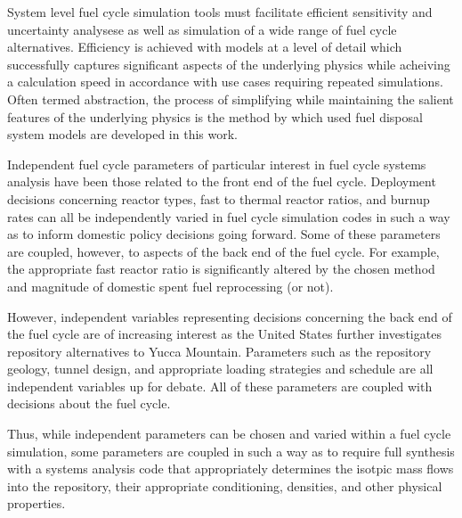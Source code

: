 System level fuel cycle simulation tools must facilitate efficient 
sensitivity and uncertainty analysese as well as simulation of a wide 
range of fuel cycle alternatives.  Efficiency is achieved with 
models at a level of detail which successfully captures significant 
aspects of the underlying physics while acheiving a calculation speed 
in accordance with use cases requiring repeated simulations. Often 
termed abstraction, the process of simplifying while maintaining the 
salient features of the underlying physics is the method by which used 
fuel disposal system models are developed in this work. 


Independent fuel cycle parameters of particular interest in fuel cycle systems 
analysis have been those related to the front end of the fuel cycle. Deployment 
decisions concerning reactor types, fast to thermal reactor ratios, and burnup 
rates can all be independently varied in fuel cycle simulation codes in such a 
way as to inform domestic policy decisions going forward. Some of these 
parameters are coupled, however, to aspects of the back end of the fuel cycle. 
For example, the appropriate fast reactor ratio is significantly altered by the 
chosen method and magnitude of domestic spent fuel reprocessing (or not).


However, independent variables representing decisions concerning the back end
of the fuel cycle are of increasing interest as the United States further
investigates repository alternatives to Yucca Mountain.  Parameters such as the
repository geology, tunnel design, and appropriate loading strategies and
schedule are all independent variables up for debate. All of these
parameters are coupled with decisions about the fuel cycle. 


Thus, while independent parameters can be chosen and varied
within a fuel cycle simulation, some parameters are coupled in such a way as to
require full synthesis with a systems analysis code that appropriately
determines the isotpic mass flows into the repository, their appropriate
conditioning, densities, and other physical properties.  

